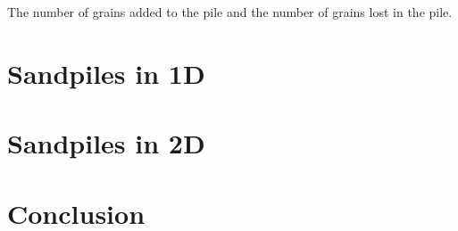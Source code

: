 \documentclass{article}
\begin{document}
The number of grains added to the pile and the number of grains lost in the pile.


\section{Sandpiles in 1D}


\section{Sandpiles in 2D}



\section{Conclusion}
\end{document}
